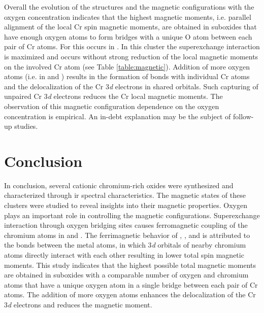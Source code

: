\begin{refsection}
Overall the evolution of the structures and the magnetic configurations with the oxygen concentration indicates that the highest magnetic moments, i.e. parallel alignment of the local Cr spin magnetic moments, are obtained in suboxides that have enough oxygen atoms to form  bridges with a unique O atom between each pair of Cr atoms. For  this occurs in . In this cluster the superexchange interaction is maximized and occurs without strong reduction of the local magnetic moments on the involved Cr atom (see Table \ref{table:magnetic}). Addition of more oxygen atoms (i.e. in  and ) results in the formation of  bonds with individual Cr atoms and the delocalization of the Cr 3\textit{d} electrons in  shared orbitals. Such capturing of unpaired Cr 3\textit{d} electrons reduces the Cr local magnetic moments. The observation of this magnetic configuration dependence on the oxygen concentration is empirical. An in-debt explanation may be the subject of follow-up studies.




\section{Conclusion}

In conclusion, several cationic chromium-rich oxides were synthesized and characterized through \acrshort{ir} spectral characteristics. The magnetic states of these clusters were studied to reveal insights into their magnetic properties. Oxygen plays an important role in controlling the magnetic configurations. Superexchange interaction through oxygen bridging sites causes ferromagnetic coupling of the chromium atoms in  and . The ferrimagnetic behavior of , , and  is attributed to the bonds between the metal atoms, in which 3\textit{d} orbitals of nearby chromium atoms directly interact with each other resulting in lower total spin magnetic moments. This study indicates that the highest possible total magnetic moments are obtained in suboxides with a comparable number of oxygen and chromium atoms that have a unique oxygen atom in a single  bridge between each pair of Cr atoms. The addition of more oxygen atoms enhances the delocalization of the Cr 3\textit{d} electrons and reduces the magnetic moment.







\printbibliography[heading=subbibliography] %

\end{refsection}
